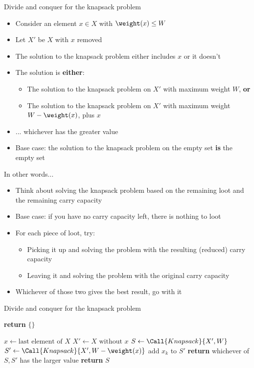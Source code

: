 \begin{frame}{Divide and conquer for the knapsack problem}
	\begin{itemize}
		\pause\item Consider an element $x \in X$ with $\weight(x) \leq W$
		\pause\item Let $X'$ be $X$ with $x$ removed
		\pause\item The solution to the knapsack problem either includes $x$ or it doesn't
		\pause\item The solution is \textbf{either}:
			\begin{itemize}
				\pause\item The solution to the knapsack problem on $X'$ with maximum weight $W$, \textbf{or}
				\pause\item The solution to the knapsack problem on $X'$ with maximum weight $W - \weight(x)$,
					plus $x$
			\end{itemize}
		\pause\item ... whichever has the greater value
		\pause\item Base case: the solution to the knapsack problem on the empty set \textbf{is} the empty set
	\end{itemize}
\end{frame}

\begin{frame}{In other words...}
	\begin{itemize}
		\pause\item Think about solving the knapsack problem based on the remaining loot and the remaining carry capacity
		\pause\item Base case: if you have no carry capacity left, there is nothing to loot
		\pause\item For each piece of loot, try:
		\begin{itemize}
			\pause\item Picking it up and solving the problem with the resulting (reduced) carry capacity
			\pause\item Leaving it and solving the problem with the original carry capacity
		\end{itemize}
		\pause\item Whichever of those two gives the best result, go with it
	\end{itemize}
\end{frame}

\begin{frame}{Divide and conquer for the knapsack problem}
	\begin{algorithmic}
		 \pause
				\State \textbf{return} $\{\}$
			\EndIf \pause

			\State $x \gets \text{last element of $X$}$ \pause
			\State $X' \gets X \text{ without } x$ \pause
			\State $S \gets \Call{Knapsack}{X', W}$ \pause
			 \pause
				\State $S' \gets \Call{Knapsack}{X', W - \weight(x)}$
				\State add $x_k$ to $S'$ \pause
				\State \textbf{return} whichever of $S,S'$ has the larger value \pause
			\Else
				\State \textbf{return} $S$
			\EndIf
		\EndProcedure
	\end{algorithmic}
\end{frame}

